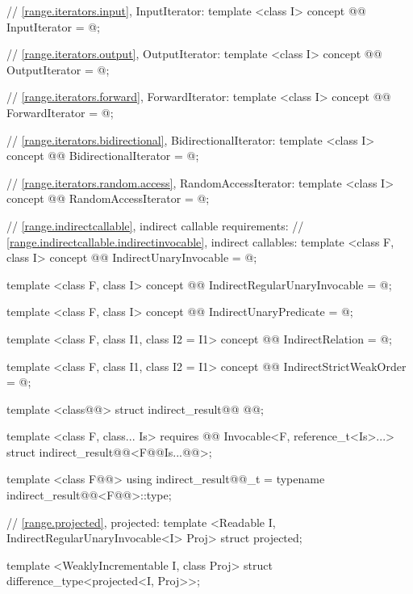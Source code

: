 {\begin{codeblock}
{{    // \ref{range.iterators.input}, InputIterator:
    template <class I>
    concept @@ InputIterator = @\seebelow@;

    // \ref{range.iterators.output}, OutputIterator:
    template <class I>
    concept @@ OutputIterator = @\seebelow@;

    // \ref{range.iterators.forward}, ForwardIterator:
    template <class I>
    concept @@ ForwardIterator = @\seebelow@;

    // \ref{range.iterators.bidirectional}, BidirectionalIterator:
    template <class I>
    concept @@ BidirectionalIterator = @\seebelow@;

    // \ref{range.iterators.random.access}, RandomAccessIterator:
    template <class I>
    concept @@ RandomAccessIterator = @\seebelow@;

    // \ref{range.indirectcallable}, indirect callable requirements:
    // \ref{range.indirectcallable.indirectinvocable}, indirect callables:
    template <class F, class I>
    concept @@ IndirectUnaryInvocable = @\seebelow@;

    template <class F, class I>
    concept @@ IndirectRegularUnaryInvocable = @\seebelow@;

    template <class F, class I>
    concept @@ IndirectUnaryPredicate = @\seebelow@;

    template <class F, class I1, class I2 = I1>
    concept @@ IndirectRelation = @\seebelow@;

    template <class F, class I1, class I2 = I1>
    concept @@ IndirectStrictWeakOrder = @\seebelow@;

    template <class@@>
    struct indirect_result@@ @\newtxt{\{ \}}@;

    template <class F, class... Is>
      requires @@ Invocable<F, reference_t<Is>...>
    struct indirect_result@@<F@\oldtxt{(}\newtxt{, }@Is...@\oldtxt{)}@>;

    template <class F@@>
    using indirect_result@@_t
      = typename indirect_result@@<F@@>::type;

    // \ref{range.projected}, projected:
    template <Readable I, IndirectRegularUnaryInvocable<I> Proj>
    struct projected;

    template <WeaklyIncrementable I, class Proj>
    struct difference_type<projected<I, Proj>>;

}}
\end{codeblock}}
